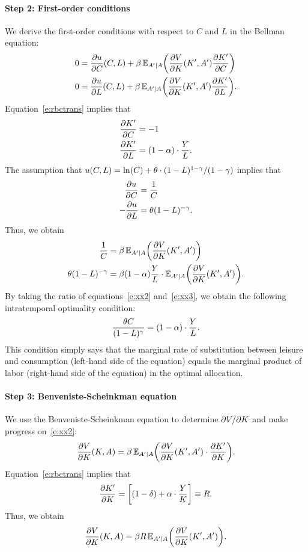 \documentclass[letterpaper, 11pt, leqno]{article}
\begin{document}
\paragraph{Step 2: First-order conditions} We derive the first-order conditions with respect to $C$ and $L$ in the Bellman equation:
\begin{align*}
0&= \pd{u}{C}(C,L) +\b \E[A'\mid A]{\pd{V}{K}(K',A') \pd{K'}{C}}\\
0&=\pd{u}{L}(C,L) +\b \E[A'\mid A]{\pd{V}{K}(K',A') \pd{K'}{L}}.
\end{align*}
Equation~\eqref{e:rbctrans} implies that
\begin{align*}
\pd{K'}{C}&=-1\\
\pd{K'}{L}&=(1-\a)\cdot \frac{Y}{L}.
\end{align*}
The assumption that $u(C,L)=\ln{C}+\t\cdot (1-L)^{1-\g}/(1-\g)$ implies that
\begin{align*}
\pd{u}{C}&=\frac{1}{C}\\
-\pd{u}{L}&=\t (1-L)^{-\g}.
\end{align*}
Thus, we obtain
\begin{align}
\frac{1}{C}&=\b \E[A'\mid A]{\pd{V}{K}(K',A')} \label{e:xx2}\\
\t (1-L)^{-\g}&=\b (1-\a) \frac{Y}{L}\cdot \E[A'\mid A]{\pd{V}{K}(K',A')}\label{e:xx3}.
\end{align}
By taking the ratio of equations~\eqref{e:xx2} and~\eqref{e:xx3}, we obtain the following intratemporal optimality condition:
\begin{equation}
\frac{\theta C}{(1-L)^{\gamma}}=(1-\alpha) \cdot \frac{Y}{L} \label{e:intra}.
\end{equation}
This condition simply says that the marginal rate of substitution between leisure and consumption (left-hand side of the equation) equals the marginal product of labor (right-hand side of the equation) in the optimal allocation.

\paragraph{Step 3: Benveniste-Scheinkman equation} We use the Benveniste-Scheinkman equation to determine $\pdx{V}{K}$ and make progress on~\eqref{e:xx2}: 
\begin{equation*}
\pd{V}{K}(K,A) = \b \E[A'\mid A]{\pd{V}{K}(K',A') \cdot \pd{K'}{K}}.
\end{equation*}
Equation~\eqref{e:rbctrans} implies that
\begin{equation*}
\pd{K'}{K}= \bs{(1-\d)+\a \cdot \frac{Y}{K}}\equiv R.
\end{equation*}
Thus, we obtain 
\begin{equation}
\pd{V}{K}(K,A) =\b R \E[A'\mid A]{\pd{V}{K}(K',A')}.
\label{e:xx1}\end{equation}
\end{document}
